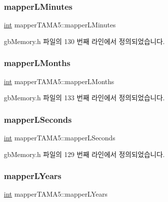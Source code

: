 \subsubsection{\texorpdfstring{mapper\+L\+Minutes}{mapperLMinutes}}
{\footnotesize\ttfamily \mbox{\hyperlink{_util_8cpp_a0ef32aa8672df19503a49fab2d0c8071}{int}} mapper\+T\+A\+M\+A5\+::mapper\+L\+Minutes}



gb\+Memory.\+h 파일의 130 번째 라인에서 정의되었습니다.

\mbox{\label{structmapper_t_a_m_a5_ad54677af9a017944377be6f9fe52e51f}} 
\subsubsection{\texorpdfstring{mapper\+L\+Months}{mapperLMonths}}
{\footnotesize\ttfamily \mbox{\hyperlink{_util_8cpp_a0ef32aa8672df19503a49fab2d0c8071}{int}} mapper\+T\+A\+M\+A5\+::mapper\+L\+Months}



gb\+Memory.\+h 파일의 133 번째 라인에서 정의되었습니다.

\mbox{\label{structmapper_t_a_m_a5_acb892e31d6bbb30b7be7802b0e20dbb7}} 
\subsubsection{\texorpdfstring{mapper\+L\+Seconds}{mapperLSeconds}}
{\footnotesize\ttfamily \mbox{\hyperlink{_util_8cpp_a0ef32aa8672df19503a49fab2d0c8071}{int}} mapper\+T\+A\+M\+A5\+::mapper\+L\+Seconds}



gb\+Memory.\+h 파일의 129 번째 라인에서 정의되었습니다.

\mbox{\label{structmapper_t_a_m_a5_aeb81064a3eaeb9934ef2c3ddfef1dad6}} 
\subsubsection{\texorpdfstring{mapper\+L\+Years}{mapperLYears}}
{\footnotesize\ttfamily \mbox{\hyperlink{_util_8cpp_a0ef32aa8672df19503a49fab2d0c8071}{int}} mapper\+T\+A\+M\+A5\+::mapper\+L\+Years}



